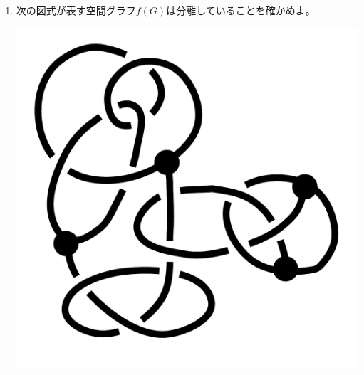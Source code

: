 \documentclass[12pt,b5paper]{ltjsarticle}
\begin{document}
\begin{enumerate}
      \hrulefill

 \item
      次の図式が表す空間グラフ$f(G)$は分離していることを確かめよ。
      \begin{center}
       \includegraphics[scale=0.2]{knot_06_01.pdf}
      \end{center}

      \dotfill


\end{enumerate}
\end{document}
